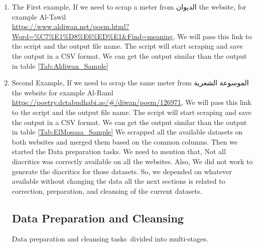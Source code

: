 \begin{enumerate}
  \item The First example, If we need to scrap a meter from \textarabic{الديوان} the website, for example Al-Tawil \\\url{https://www.aldiwan.net/poem.html?Word=\%C7\%E1\%D8\%E6\%ED\%E1\&Find=meaning}, We will pass this link to the script and the output file name. The script will start scraping and save the output in a CSV format. We can get the output similar than the output in table \ref{Tab:Aldiwan_Sample}
  \item Second Example, If we need to scrap the same meter from \textarabic{الموسوعة الشعرية} the website for example Al-Raml \url{https://poetry.dctabudhabi.ae/\#/diwan/poem/126971}, We will pass this link to the script and the output file name. The script will start scraping and save the output in a CSV format. We can get the output similar than the output in table \ref{Tab:ElMosoaa_Sample}
  We scrapped all the available datasets on both websites and merged them based on the common columns. Then we started the Data preparation tasks. We need to mention that, Not all diacritics was correctly available on all the websites. Also, We did not work to generate the diacritics for those datasets. So, we depended on whatever available without changing the data all the next sections is related to correction, preparation, and cleansing of the current datasets.

  \subsection{Data Preparation and Cleansing}\label{sec:Data_Clens}

  Data preparation and cleansing tasks divided into multi-stages.


\end{enumerate}
